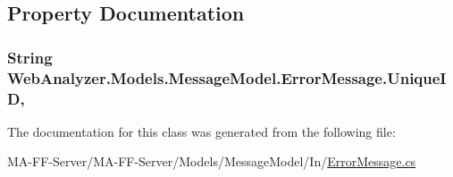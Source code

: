 \subsection{Property Documentation}
\hypertarget{class_web_analyzer_1_1_models_1_1_message_model_1_1_error_message_a795e90650dd234f29a110e27643828e2}{}
\subsubsection[{Unique\+I\+D}]{\setlength{\rightskip}{0pt plus 5cm}String Web\+Analyzer.\+Models.\+Message\+Model.\+Error\+Message.\+Unique\+I\+D\hspace{0.3cm}{\ttfamily [get]}, {\ttfamily [set]}}\label{class_web_analyzer_1_1_models_1_1_message_model_1_1_error_message_a795e90650dd234f29a110e27643828e2}


The documentation for this class was generated from the following file\+:\begin{DoxyCompactItemize}
\item 
M\+A-\/\+F\+F-\/\+Server/\+M\+A-\/\+F\+F-\/\+Server/\+Models/\+Message\+Model/\+In/\hyperlink{_error_message_8cs}{Error\+Message.\+cs}\end{DoxyCompactItemize}
